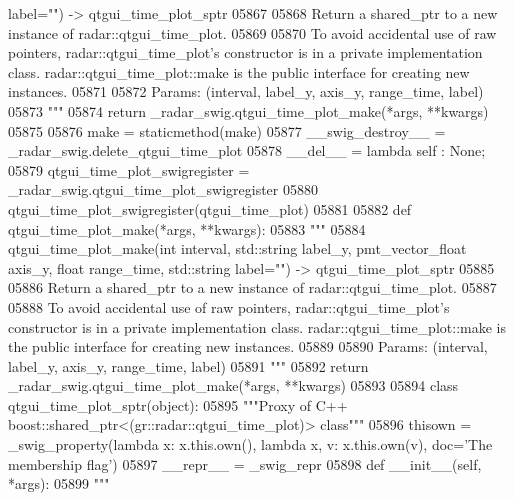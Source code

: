 \begin{DoxyCode}
{{{{{{{{{{{{{{{{{{{{{       label="") -> qtgui\_time\_plot\_sptr}
05867 \textcolor{stringliteral}{}
05868 \textcolor{stringliteral}{        Return a shared\_ptr to a new instance of radar::qtgui\_time\_plot.}
05869 \textcolor{stringliteral}{}
05870 \textcolor{stringliteral}{        To avoid accidental use of raw pointers, radar::qtgui\_time\_plot's constructor is in a private
       implementation class. radar::qtgui\_time\_plot::make is the public interface for creating new instances.}
05871 \textcolor{stringliteral}{}
05872 \textcolor{stringliteral}{        Params: (interval, label\_y, axis\_y, range\_time, label)}
05873 \textcolor{stringliteral}{        """}
05874         \textcolor{keywordflow}{return} \_radar\_swig.qtgui\_time\_plot\_make(*args, **kwargs)
05875 
05876     make = staticmethod(make)
05877     \_\_swig\_destroy\_\_ = \_radar\_swig.delete\_qtgui\_time\_plot
05878     \_\_del\_\_ = \textcolor{keyword}{lambda} self : \textcolor{keywordtype}{None};
05879 qtgui\_time\_plot\_swigregister = \_radar\_swig.qtgui\_time\_plot\_swigregister
05880 qtgui_time_plot_swigregister(qtgui\_time\_plot)
05881 
05882 \textcolor{keyword}{def }qtgui_time_plot_make(*args, **kwargs):
05883   \textcolor{stringliteral}{"""}
05884 \textcolor{stringliteral}{    qtgui\_time\_plot\_make(int interval, std::string label\_y, pmt\_vector\_float axis\_y, float range\_time,
       std::string label="") -> qtgui\_time\_plot\_sptr}
05885 \textcolor{stringliteral}{}
05886 \textcolor{stringliteral}{    Return a shared\_ptr to a new instance of radar::qtgui\_time\_plot.}
05887 \textcolor{stringliteral}{}
05888 \textcolor{stringliteral}{    To avoid accidental use of raw pointers, radar::qtgui\_time\_plot's constructor is in a private
       implementation class. radar::qtgui\_time\_plot::make is the public interface for creating new instances.}
05889 \textcolor{stringliteral}{}
05890 \textcolor{stringliteral}{    Params: (interval, label\_y, axis\_y, range\_time, label)}
05891 \textcolor{stringliteral}{    """}
05892   \textcolor{keywordflow}{return} \_radar\_swig.qtgui\_time\_plot\_make(*args, **kwargs)
05893 
05894 \textcolor{keyword}{class }qtgui_time_plot_sptr(object):
05895     \textcolor{stringliteral}{"""Proxy of C++ boost::shared\_ptr<(gr::radar::qtgui\_time\_plot)> class"""}
05896     thisown = _swig_property(\textcolor{keyword}{lambda} x: x.this.own(), \textcolor{keyword}{lambda} x, v: x.this.own(v), doc=\textcolor{stringliteral}{'The membership flag'})
05897     \_\_repr\_\_ = \_swig\_repr
05898     \textcolor{keyword}{def }__init__(self, *args): 
05899         \textcolor{stringliteral}{"""}
}}}}}}}}}}}}}}}}}}}}
\end{DoxyCode}
